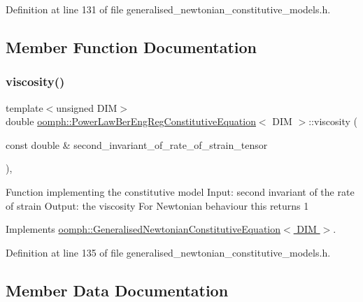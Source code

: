 Definition at line 131 of file generalised\+\_\+newtonian\+\_\+constitutive\+\_\+models.\+h.



\subsection{Member Function Documentation}
\mbox{\label{classoomph_1_1PowerLawBerEngRegConstitutiveEquation_a9f98f9120f7fe2aa6813098a946459de}} 
\subsubsection{\texorpdfstring{viscosity()}{viscosity()}}
{\footnotesize\ttfamily template$<$unsigned D\+IM$>$ \\
double \hyperlink{classoomph_1_1PowerLawBerEngRegConstitutiveEquation}{oomph\+::\+Power\+Law\+Ber\+Eng\+Reg\+Constitutive\+Equation}$<$ D\+IM $>$\+::viscosity (\begin{DoxyParamCaption}\item[{const double \&}]{second\+\_\+invariant\+\_\+of\+\_\+rate\+\_\+of\+\_\+strain\+\_\+tensor }\end{DoxyParamCaption})\hspace{0.3cm}{\ttfamily [inline]}, {\ttfamily [virtual]}}

Function implementing the constitutive model Input\+: second invariant of the rate of strain Output\+: the viscosity For Newtonian behaviour this returns 1 

Implements \hyperlink{classoomph_1_1GeneralisedNewtonianConstitutiveEquation_a3e6d811786e39ca3c3a9b1c46249442f}{oomph\+::\+Generalised\+Newtonian\+Constitutive\+Equation$<$ D\+I\+M $>$}.



Definition at line 135 of file generalised\+\_\+newtonian\+\_\+constitutive\+\_\+models.\+h.



\subsection{Member Data Documentation}
\mbox{\label{classoomph_1_1PowerLawBerEngRegConstitutiveEquation_ac69a79185f6ca3b4e467a5fd2489914f}} 
